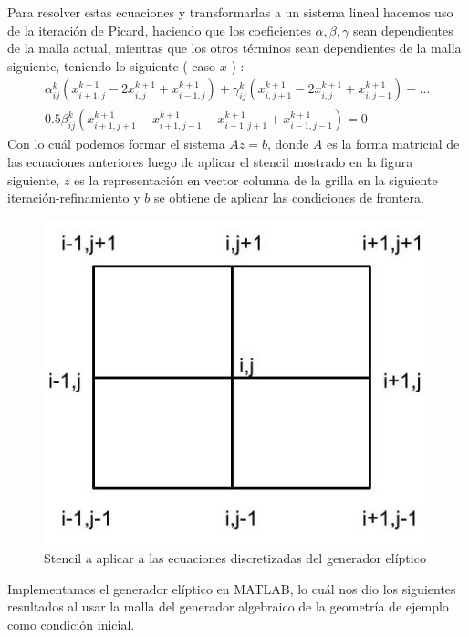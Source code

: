 \documentclass[11pt,letterpaper]{article}
\begin{document}
		Para resolver estas ecuaciones y transformarlas a un sistema lineal hacemos uso de la iteraci\'on de Picard, haciendo que los coeficientes $\alpha, \beta, \gamma$
		sean dependientes de la malla actual, mientras que los otros t\'erminos sean dependientes de la malla siguiente, teniendo lo siguiente ( caso $x$ ) :
		\begin{gather*}
			\alpha_{ij}^{k} ( x_{i+1,j}^{k+1} - 2 x_{i,j}^{k+1} + x_{i-1,j}^{k+1} ) + \gamma_{ij}^{k} ( x_{i, j + 1}^{k+1} - 2 x_{i, j}^{k+1} + x_{i,j-1}^{k+1} ) - \hdots \\
				 0.5 \beta_{ij}^{k} ( x_{i+1,j+1}^{k+1} - x_{i+1,j-1}^{k+1} - x_{i-1,j+1}^{k+1} + x_{i-1,j-1}^{k+1} ) = 0
		\end{gather*}
		Con lo cu\'al podemos formar el sistema $Az = b$, donde $A$ es la forma matricial de las ecuaciones anteriores luego de aplicar el stencil mostrado en la figura siguiente, $z$ es la representaci\'on en vector columna de la grilla en la siguiente iteraci\'on-refinamiento y $b$ se obtiene de aplicar las condiciones de frontera.
		\begin{figure}[H]
			\centering
			\includegraphics[scale=0.5]{./imgs/img_stencil.jpg}
			\caption{Stencil a aplicar a las ecuaciones discretizadas del generador el\'iptico}
			\label{fig:img_stencil}
		\end{figure}
		Implementamos el generador el\'iptico en MATLAB, lo cu\'al nos dio los siguientes resultados al usar la malla del generador algebraico de la geometr\'ia de ejemplo como condici\'on inicial.
		
\end{document}
